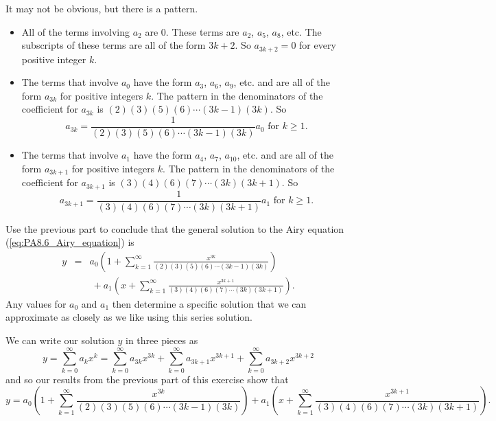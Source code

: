 \begin{exercises}
\begin{exerciseSolution}
It may not be obvious, but there is a pattern.
\begin{itemize}
\item All of the terms involving $a_2$ are 0. These terms are $a_2$, $a_5$, $a_8$, etc. The subscripts of these terms are all of the form $3k+2$. So $a_{3k+2} = 0$ for every positive integer $k$.
\item The terms that involve $a_0$ have the form $a_3$, $a_6$, $a_{9}$, etc. and are all of the form $a_{3k}$ for positive integers $k$. The pattern in the denominators of the coefficient for $a_{3k}$ is $(2)(3)(5)(6) \cdots (3k-1)(3k)$. So
    \[a_{3k} = \frac{1}{(2)(3)(5)(6) \cdots (3k-1)(3k)} a_0 \text{ for } k \geq 1.\]
\item The terms that involve $a_1$ have the form $a_4$, $a_7$, $a_{10}$, etc. and are all of the form $a_{3k+1}$ for positive integers $k$. The pattern in the denominators of the coefficient for $a_{3k+1}$ is $(3)(4)(6)(7) \cdots (3k)(3k+1)$. So
    \[a_{3k+1} = \frac{1}{(3)(4)(6)(7) \cdots (3k)(3k+1)} a_1 \text{ for } k \geq 1.\]
\end{itemize}

\end{exerciseSolution}

    \item Use the previous part to conclude that the general solution to the Airy equation (\ref{eq:PA8.6_Airy_equation}) is
\begin{eqnarray*} %
y & = & a_0\left( 1+\sum_{k=1}^{\infty} \frac{x^{3k}}{(2)(3)(5)(6) \cdots (3k-1)(3k)} \right) \\
   & \ & \  + a_1 \left( x + \sum_{k=1}^{\infty} \frac{x^{3k+1}}{(3)(4)(6)(7) \cdots (3k)(3k+1)} \right).
\end{eqnarray*}
Any values for $a_0$ and $a_1$ then determine a specific solution that we can approximate as closely as we like using this series solution.

\begin{exerciseSolution}

We can write our solution $y$ in three pieces as
\[y = \sum_{k = 0}^{\infty} a_kx^k = \sum_{k=0}^{\infty} a_{3k}x^{3k} + \sum_{k=0}^{\infty} a_{3k+1}x^{3k+1} + \sum_{k=0}^{\infty} a_{3k+2}x^{3k+2}\]
and so our results from the previous part of this exercise show that
\[y = a_0\left( 1+\sum_{k=1}^{\infty} \frac{x^{3k}}{(2)(3)(5)(6) \cdots (3k-1)(3k)} \right) + a_1 \left( x + \sum_{k=1}^{\infty} \frac{x^{3k+1}}{(3)(4)(6)(7) \cdots (3k)(3k+1)} \right).\]


\end{exerciseSolution}
\end{exercises}
